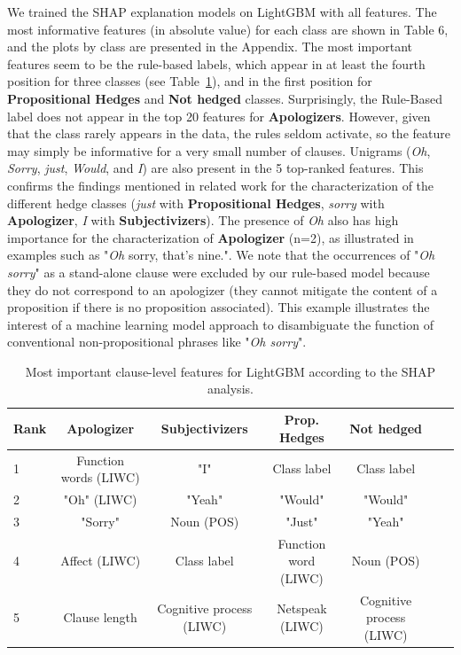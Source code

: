 \documentclass[11pt]{article}
\begin{document}
\noindent We trained the SHAP explanation models on LightGBM with all features. The most informative features (in absolute value) for each class are shown in Table 6, and the plots by class are presented in the Appendix. The most important features seem to be the rule-based labels, which appear in at least the fourth position for three classes (see Table~\ref{tab:6}), and in the first position for \textbf{Propositional Hedges} and \textbf{Not hedged} classes. Surprisingly, the Rule-Based label does not appear in the top 20 features for \textbf{Apologizers}. However, given that the class rarely appears in the data, the rules seldom activate, so the feature may simply be informative for a very small number of clauses. Unigrams (\textit{Oh}, \textit{Sorry}, \textit{just}, \textit{Would}, and \textit{I}) are also present in the 5 top-ranked features. This confirms the findings mentioned in related work for the characterization of the different hedge classes (\textit{just} with \textbf{Propositional Hedges}, \textit{sorry} with \textbf{Apologizer}, \textit{I} with \textbf{Subjectivizers}). The presence of \textit{Oh} also has high importance for the characterization of \textbf{Apologizer} (n=2), as illustrated in examples such as "\textit{Oh} sorry, that's nine.". We note that the occurrences of "\textit{Oh sorry}" as a stand-alone clause were excluded by our rule-based model because they do not correspond to an apologizer (they cannot mitigate the content of a proposition if there is no proposition associated). This example illustrates the interest of a machine learning model approach to disambiguate the function of conventional non-propositional phrases like "\textit{Oh sorry}".

\begin{table}[t]
  \tabcolsep=0.08cm
  \footnotesize
  \centering
  \begin{tabular}{lcccccc} \toprule
    Rank & Apologizer & Subjectivizers & Prop. Hedges & Not hedged \\ \midrule
    1 & Function words (LIWC) & "I" & Class label & Class label \\
    2 & "Oh" (LIWC) & "Yeah" & "Would" & "Would" \\
    3 & "Sorry" & Noun (POS) & "Just" & "Yeah" \\
    4 & Affect (LIWC) & Class label & Function word (LIWC) & Noun (POS) \\
    5 & Clause length & Cognitive process (LIWC) & Netspeak (LIWC) & Cognitive process (LIWC) \\
  \end{tabular}
  \caption{Most important clause-level features for LightGBM according to the SHAP analysis.}
  \label{tab:6}
\end{table}
\end{document}
